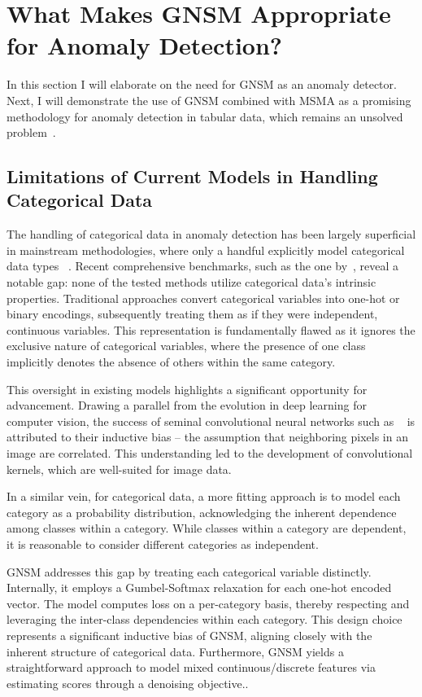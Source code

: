 \section{What Makes GNSM Appropriate for Anomaly Detection?}\label{sec:gumbel_ano}

In this section I will elaborate on the need for GNSM as an anomaly detector. Next, I will demonstrate the use of GNSM combined with MSMA as a promising methodology for anomaly detection in tabular data, which remains an unsolved problem~\cite{pang_deep_2021, ruff_unifying_2021, aggarwal_introduction_2017}.  

\subsection*{Limitations of Current Models in Handling Categorical Data}

The handling of categorical data in anomaly detection has been largely superficial in mainstream methodologies, where only a handful explicitly model categorical data types ~\cite{pang2021homophily}. Recent comprehensive benchmarks, such as the one by~\cite{han2022adbench}, reveal a notable gap: none of the tested methods utilize categorical data's intrinsic properties. Traditional approaches convert categorical variables into one-hot or binary encodings, subsequently treating them as if they were independent, continuous variables. This representation is fundamentally flawed as it ignores the exclusive nature of categorical variables, where the presence of one class implicitly denotes the absence of others within the same category.

This oversight in existing models highlights a significant opportunity for advancement. Drawing a parallel from the evolution in deep learning for computer vision, the success of seminal convolutional neural networks such as ~\cite{alexnet,vgg} is attributed to their inductive bias – the assumption that neighboring pixels in an image are correlated. This understanding led to the development of convolutional kernels, which are well-suited for image data.

In a similar vein, for categorical data, a more fitting approach is to model each category as a probability distribution, acknowledging the inherent dependence among classes within a category. While classes within a category are dependent, it is reasonable to consider different categories as independent.

GNSM addresses this gap by treating each categorical variable distinctly. Internally, it employs a Gumbel-Softmax relaxation for each one-hot encoded vector. The model computes loss on a per-category basis, thereby respecting and leveraging the inter-class dependencies within each category. This design choice represents a significant inductive bias of GNSM, aligning closely with the inherent structure of categorical data.  Furthermore, GNSM yields a straightforward approach to model mixed continuous/discrete features via estimating scores through a denoising objective..

